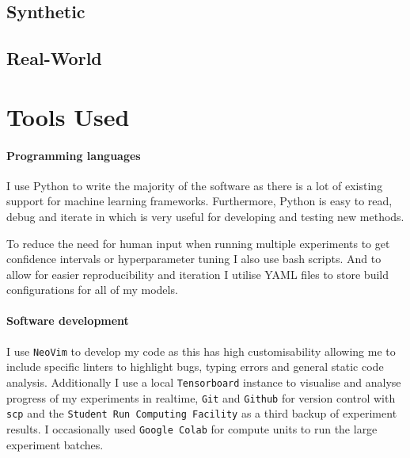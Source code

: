 \subsection{Synthetic}


\subsection{Real-World}


\section{Tools Used}


\paragraph{Programming languages}
I use Python to write the majority of the software as there is a lot of existing support for machine learning frameworks.
Furthermore, Python is easy to read, debug and iterate in which is very useful for developing and testing new methods.

To reduce the need for human input when running multiple experiments to get confidence intervals or hyperparameter tuning I also use bash scripts.
And to allow for easier reproducibility and iteration I utilise YAML files to store build configurations for all of my models.

\paragraph{Software development}

I use \texttt{NeoVim} to develop my code as this has high customisability allowing me to include specific linters to highlight bugs, typing errors and general static code analysis.
Additionally I use a local \texttt{Tensorboard} instance to visualise and analyse progress of my experiments in realtime, \texttt{Git} and \texttt{Github} for version control with \texttt{scp} and the \texttt{Student Run Computing Facility} as a third backup of experiment results.
I occasionally used \texttt{Google Colab} for compute units to run the large experiment batches.

